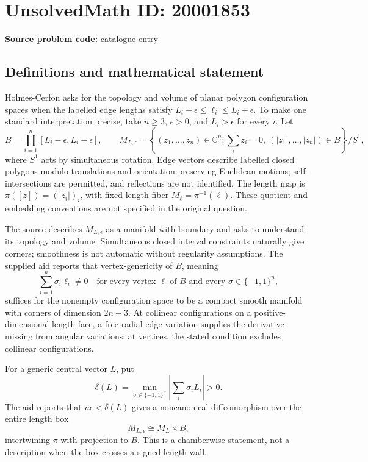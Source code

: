 \documentclass[11pt]{article}
\newcommand{\C}{\mathbb{C}}
\begin{document}
\section*{UnsolvedMath ID: 20001853}
\textbf{Source problem code:} catalogue entry
\subsection{Definitions and mathematical statement}
Holmes-Cerfon asks for the topology and volume of planar polygon configuration spaces when the labelled edge lengths satisfy \(L_i-\epsilon\leq\ell_i\leq L_i+\epsilon\). To make one standard interpretation precise, take \(n\geq3\), \(\epsilon>0\), and \(L_i>\epsilon\) for every \(i\). Let
\[
B=\prod_{i=1}^n[L_i-\epsilon,L_i+\epsilon],\qquad
M_{L,\epsilon}=\left\{(z_1,\ldots,z_n)\in\C^n:
\sum_i z_i=0,\ (|z_1|,\ldots,|z_n|)\in B\right\}/S^1,
\]
where \(S^1\) acts by simultaneous rotation. Edge vectors describe labelled closed polygons modulo translations and orientation-preserving Euclidean motions; self-intersections are permitted, and reflections are not identified. The length map is \(\pi([z])=(|z_i|)_i\), with fixed-length fiber \(M_\ell=\pi^{-1}(\ell)\). These quotient and embedding conventions are not specified in the original question.

The source describes \(M_{L,\epsilon}\) as a manifold with boundary and asks to understand its topology and volume. Simultaneous closed interval constraints naturally give corners; smoothness is not automatic without regularity assumptions. The supplied aid reports that vertex-genericity of \(B\), meaning
\[
\sum_{i=1}^n\sigma_i\ell_i\ne0
\quad\text{for every vertex }\ell\text{ of }B
\text{ and every }\sigma\in\{-1,1\}^n,
\]
suffices for the nonempty configuration space to be a compact smooth manifold with corners of dimension \(2n-3\). At collinear configurations on a positive-dimensional length face, a free radial edge variation supplies the derivative missing from angular variations; at vertices, the stated condition excludes collinear configurations.

For a generic central vector \(L\), put
\[
\delta(L)=\min_{\sigma\in\{-1,1\}^n}\left|\sum_i\sigma_iL_i\right|>0.
\]
The aid reports that \(n\epsilon<\delta(L)\) gives a noncanonical diffeomorphism over the entire length box
\[
M_{L,\epsilon}\cong M_L\times B,
\]
intertwining \(\pi\) with projection to \(B\). This is a chamberwise statement, not a description when the box crosses a signed-length wall.
\end{document}
